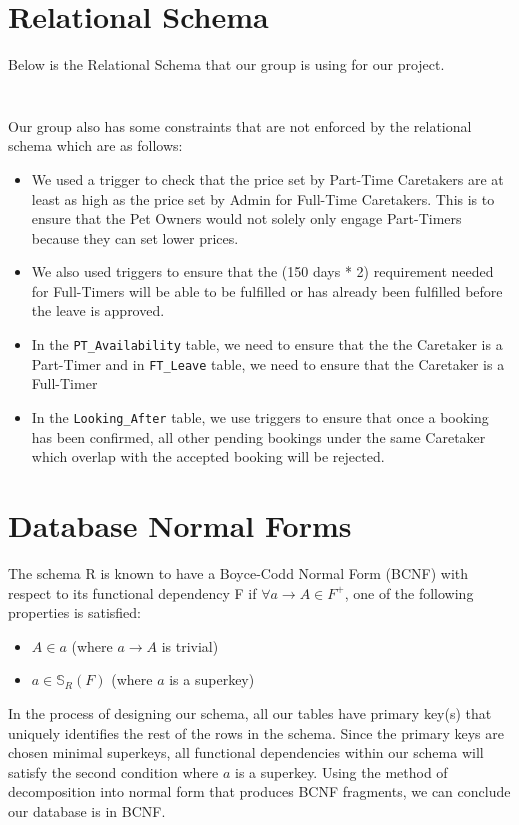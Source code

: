 \documentclass[10pt]{article}
\begin{document}
\newpage


\section{Relational Schema}
Below is the Relational Schema that our group is using for our project. 
\newline
\inputminted[breaklines, tabsize=8, obeytabs, fontsize=\footnotesize]{postgresql}{./codes/init_part1.sql}
\newpage
\inputminted[breaklines, tabsize=8, obeytabs, fontsize=\footnotesize]{postgresql}{./codes/init_part2.sql}

Our group also has some constraints that are not enforced by the relational schema which are as follows:
\begin{itemize}
    \item We used a trigger to check that the price set by Part-Time Caretakers are at least as high as the price set by Admin for Full-Time Caretakers. This is to ensure that the Pet Owners would not solely only engage Part-Timers because they can set lower prices.
    \item We also used triggers to ensure that the (150 days * 2) requirement needed for Full-Timers will be able to be fulfilled or has already been fulfilled before the leave is approved.
    \item In the \texttt{PT\_Availability} table, we need to ensure that the the Caretaker is a Part-Timer and in \texttt{FT\_Leave} table, we need to ensure that the Caretaker is a Full-Timer
    \item In the \texttt{Looking\_After} table, we use triggers to ensure that once a booking has been confirmed, all other pending bookings under the same Caretaker which overlap with the accepted booking will be rejected. 
\end{itemize}


\section{Database Normal Forms}
The schema R is known to have a Boyce-Codd Normal Form (BCNF) with respect to its functional dependency F if \(\forall a \rightarrow A \in F^+\), one of the following properties is satisfied:
\begin{itemize}
    \item \(A \in a\) (where \(a \rightarrow A\) is trivial)
    \item \(a \in \mathbb{S}_R(F)\) (where \(a\) is a superkey) 
\end{itemize}
In the process of designing our schema, all our tables have primary key(s) that uniquely identifies the rest of the rows in the schema. Since the primary keys are chosen minimal superkeys, all functional dependencies within our schema will satisfy the second condition where $a$ is a superkey. Using the method of decomposition into normal form that produces BCNF fragments, we can conclude our database is in BCNF.
\end{document}
